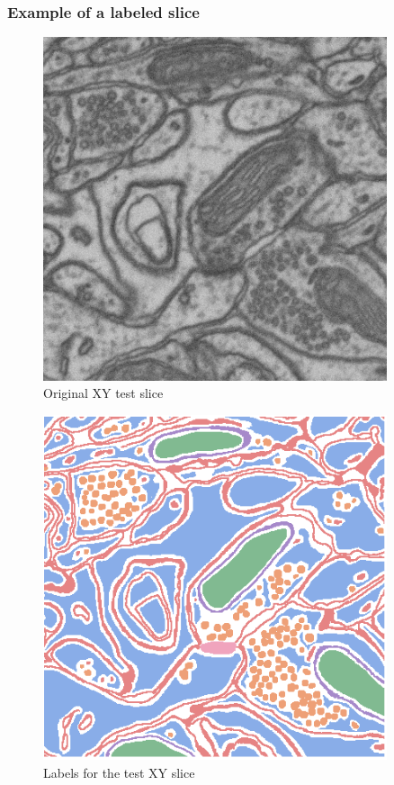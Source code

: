 \documentclass{beamer}
\begin{document}
\begin{frame}
    \frametitle{Example of a labeled slice}
    \begin{minipage}{0.49\textwidth}
        \centering
        \begin{figure}
            \includegraphics[width=0.9\textwidth]{original_slice.png}
            \caption{Original XY test slice}
        \end{figure}
    \end{minipage}
    \begin{minipage}{0.49\textwidth}
        \centering
        \begin{figure}
            \includegraphics[width=0.9\textwidth]{labeled_slice.png}
            \caption{Labels for the test XY slice}
        \end{figure}
    \end{minipage}
\end{frame}
\end{document}

